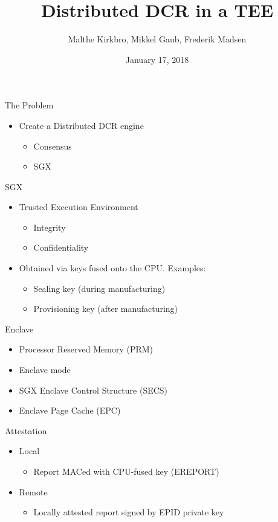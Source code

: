 \documentclass{beamer}
\title{Distributed DCR in a TEE}
\author{Malthe Kirkbro, Mikkel Gaub, Frederik Madsen}
\date{January 17, 2018}
\begin{document}
	\begin{frame}
		\maketitle	  
	\end{frame}

	\begin{frame}{The Problem} %
		\begin{itemize}
			\item Create a Distributed DCR engine
			\begin{itemize}
				\item Consensus
				\item SGX
			\end{itemize}
		\end{itemize}
	\end{frame}

	\begin{frame}{SGX} %
		\begin{itemize}
			\item Trusted Execution Environment
			\begin{itemize}
				\item Integrity
				\item Confidentiality
			\end{itemize}
			\item Obtained via keys fused onto the CPU. Examples:
			\begin{itemize}
				\item Sealing key (during manufacturing)
				\item Provisioning key (after manufacturing)
			\end{itemize}
		\end{itemize}
	\end{frame}

	\begin{frame}{Enclave} %
		\begin{itemize}
			\item Processor Reserved Memory (PRM)
			\item Enclave mode
			\item SGX Enclave Control Structure (SECS)
			\item Enclave Page Cache (EPC)
		\end{itemize}
	\end{frame}

	\begin{frame}{Attestation} %
		\begin{itemize}
			\item Local
				\begin{itemize}
					\item Report MACed with CPU-fused key (EREPORT)
				\end{itemize}
			\item Remote
				\begin{itemize}
					\item Locally attested report signed by EPID private key 
				\end{itemize}
		\end{itemize}
	\end{frame}
\end{document}

